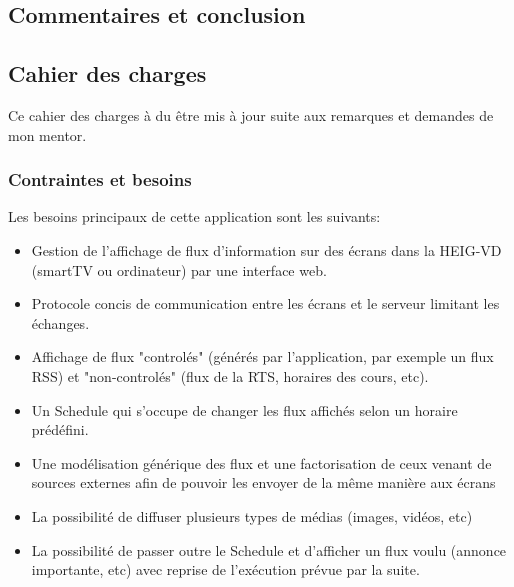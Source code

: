 \documentclass[french]{article}
\begin{document}
\newpage
\section{Commentaires et conclusion}

\newpage
\begin{appendices}
\chapter{}
\section{Cahier des charges}

Ce cahier des charges à du être mis à jour suite aux remarques et demandes de mon mentor.

\subsection{Contraintes et besoins}
Les besoins principaux de cette application sont les suivants:
\begin{itemize}
	\item Gestion de l'affichage de flux d'information sur des écrans dans la HEIG-VD (smartTV ou ordinateur) par une interface web.
	\item Protocole concis de communication entre les écrans et le serveur limitant les échanges.
	\item Affichage de flux "controlés" (générés par l'application, par exemple un flux RSS) et "non-controlés" (flux de la RTS, horaires des cours, etc).
	\item Un Schedule qui s'occupe de changer les flux affichés selon un horaire prédéfini.
	\item Une modélisation générique des flux et une factorisation de ceux venant de sources externes afin de pouvoir les envoyer de la même manière aux écrans
	\item La possibilité de diffuser plusieurs types de médias (images, vidéos, etc)
	\item La possibilité de passer outre le Schedule et d'afficher un flux voulu (annonce importante, etc) avec reprise de l'exécution prévue par la suite. \newline
\end{itemize}



\end{appendices}
\end{document}
